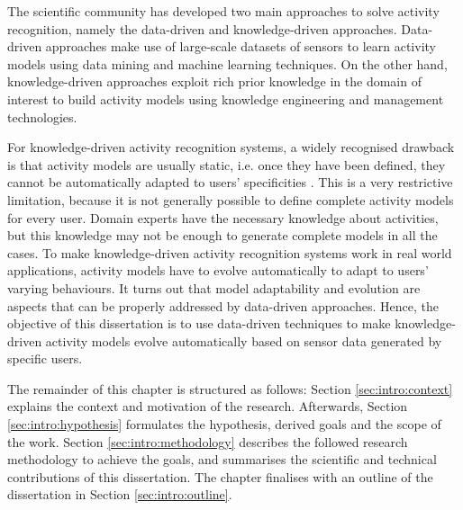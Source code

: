 
The scientific community has developed two main approaches to solve activity recognition, namely the data-driven and knowledge-driven approaches. Data-driven approaches make use of large-scale datasets of sensors to learn activity models using data mining and machine learning techniques. On the other hand, knowledge-driven approaches exploit rich prior knowledge in the domain of interest to build activity models using knowledge engineering and management technologies.


For knowledge-driven activity recognition systems, a widely recognised drawback is that activity models are usually static, i.e. once they have been defined, they cannot be automatically adapted to users' specificities \citep{Chen2014}. This is a very restrictive limitation, because it is not generally possible to define complete activity models for every user. Domain experts have the necessary knowledge about activities, but this knowledge may not be enough to generate complete models in all the cases. To make knowledge-driven activity recognition systems work in real world applications, activity models have to evolve automatically to adapt to users' varying behaviours. It turns out that model adaptability and evolution are aspects that can be properly addressed by data-driven approaches. Hence, the objective of this dissertation is to use data-driven techniques to make knowledge-driven activity models evolve automatically based on sensor data generated by specific users.


The remainder of this chapter is structured as follows: Section \ref{sec:intro:context} explains the context and motivation of the research. Afterwards, Section \ref{sec:intro:hypothesis} formulates the hypothesis, derived goals and the scope of the work. Section \ref{sec:intro:methodology} describes the followed research methodology to achieve the goals, and  summarises the scientific and technical contributions of this dissertation. The chapter finalises with an outline of the dissertation in Section \ref{sec:intro:outline}.



